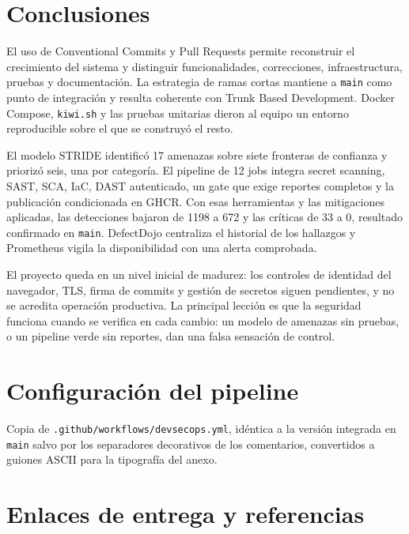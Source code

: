 \documentclass[12pt,a4paper]{article}
\DeclareRobustCommand{\ruta}[1]{\nolinkurl{#1}}
\begin{document}
\section{Conclusiones}

El uso de Conventional Commits y Pull Requests permite reconstruir el crecimiento del sistema y
distinguir funcionalidades, correcciones, infraestructura, pruebas y documentación. La estrategia
de ramas cortas mantiene a \texttt{main} como punto de integración y resulta coherente con Trunk
Based Development. Docker Compose, \texttt{kiwi.sh} y las pruebas unitarias dieron al equipo un
entorno reproducible sobre el que se construyó el resto.

El modelo STRIDE identificó 17 amenazas sobre siete fronteras de confianza y priorizó seis, una por
categoría. El pipeline de 12 jobs integra secret scanning, SAST, SCA, IaC, DAST autenticado, un gate
que exige reportes completos y la publicación condicionada en GHCR. Con esas herramientas y las
mitigaciones aplicadas, las detecciones bajaron de 1198 a 672 y las críticas de 33 a 0, resultado
confirmado en \texttt{main}. DefectDojo centraliza el historial de los hallazgos y Prometheus vigila
la disponibilidad con una alerta comprobada.

El proyecto queda en un nivel inicial de madurez: los controles de identidad del navegador, TLS,
firma de commits y gestión de secretos siguen pendientes, y no se acredita operación productiva. La
principal lección es que la seguridad funciona cuando se verifica en cada cambio: un modelo de
amenazas sin pruebas, o un pipeline verde sin reportes, dan una falsa sensación de control.

\clearpage
\appendix
\renewcommand{\thesection}{\Alph{section}}

\section{Configuración del pipeline}
\label{sec:anexo-yaml}

Copia de \ruta{.github/workflows/devsecops.yml}, idéntica a la versión integrada en \texttt{main}
salvo por los separadores decorativos de los comentarios, convertidos a guiones ASCII para la
tipografía del anexo.



\section{Enlaces de entrega y referencias}
\label{sec:enlaces}
\end{document}
